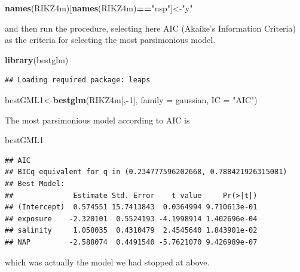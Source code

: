 \documentclass[
]{book}
\newenvironment{Shaded}{\begin{snugshade}}{\end{snugshade}}
\newcommand{\AttributeTok}[1]{\textcolor[rgb]{0.13,0.29,0.53}{#1}}
\newcommand{\DecValTok}[1]{\textcolor[rgb]{0.00,0.00,0.81}{#1}}
\newcommand{\FunctionTok}[1]{\textcolor[rgb]{0.13,0.29,0.53}{\textbf{#1}}}
\newcommand{\NormalTok}[1]{#1}
\newcommand{\OtherTok}[1]{\textcolor[rgb]{0.56,0.35,0.01}{#1}}
\newcommand{\SpecialCharTok}[1]{\textcolor[rgb]{0.81,0.36,0.00}{\textbf{#1}}}
\newcommand{\StringTok}[1]{\textcolor[rgb]{0.31,0.60,0.02}{#1}}
\begin{document}
\begin{Shaded}
\begin{Highlighting}[]
\FunctionTok{names}\NormalTok{(RIKZ4m)[}\FunctionTok{names}\NormalTok{(RIKZ4m)}\SpecialCharTok{==}\StringTok{"nsp"}\NormalTok{]}\OtherTok{\textless{}{-}}\StringTok{"y"}
\end{Highlighting}
\end{Shaded}

and then run the procedure, selecting here AIC (Akaike's Information Criteria) as the criteria for selecting the most parsimonious model.

\begin{Shaded}
\begin{Highlighting}[]
\FunctionTok{library}\NormalTok{(bestglm)}
\end{Highlighting}
\end{Shaded}

\begin{verbatim}
## Loading required package: leaps
\end{verbatim}

\begin{Shaded}
\begin{Highlighting}[]
\NormalTok{bestGML1}\OtherTok{\textless{}{-}}\FunctionTok{bestglm}\NormalTok{(RIKZ4m[,}\SpecialCharTok{{-}}\DecValTok{1}\NormalTok{], }\AttributeTok{family =}\NormalTok{ gaussian, }\AttributeTok{IC =} \StringTok{"AIC"}\NormalTok{)}
\end{Highlighting}
\end{Shaded}

The most parsimonious model according to AIC is

\begin{Shaded}
\begin{Highlighting}[]
\NormalTok{bestGML1}
\end{Highlighting}
\end{Shaded}

\begin{verbatim}
## AIC
## BICq equivalent for q in (0.234777596202668, 0.788421926315081)
## Best Model:
##              Estimate Std. Error    t value     Pr(>|t|)
## (Intercept)  0.574551 15.7413843  0.0364994 9.710613e-01
## exposure    -2.320101  0.5524193 -4.1998914 1.402696e-04
## salinity     1.058035  0.4310479  2.4545640 1.843901e-02
## NAP         -2.588074  0.4491540 -5.7621070 9.426989e-07
\end{verbatim}

which was actually the model we had stopped at above.
\end{document}
